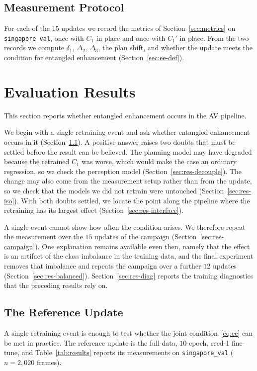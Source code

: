 \documentclass[conference]{IEEEtran}
\begin{document}
\subsection{Measurement Protocol}
For each of the $15$ updates we record the metrics of Section~\ref{sec:metrics} on
\texttt{singapore\_val}, once with $C_1$ in place and once with $C_1'$ in place.
From the two records we compute $\delta_1$, $\Delta_2$, $\Delta_3$, the plan shift,
and whether the update meets the condition for entangled enhancement
(Section~\ref{sec:ee-def}).

\section{Evaluation Results}
\label{sec:results}
This section reports whether entangled enhancement occurs in the AV pipeline.

We begin with a single retraining event and ask whether entangled enhancement
occurs in it (Section~\ref{sec:res-ref}). A positive answer raises two doubts
that must be settled before the result can be believed. The planning model may have
degraded because the retrained $C_1$ was worse, which would make the case an
ordinary regression, so we check the perception model
(Section~\ref{sec:res-decouple}). The change may also come from the measurement
setup rather than from the update, so we check that the models we did not retrain
were untouched (Section~\ref{sec:res-iso}). With both doubts settled, we locate
the point along the pipeline where the retraining has its largest effect
(Section~\ref{sec:res-interface}).

A single event cannot show how often the condition arises. We therefore repeat
the measurement over the $15$ updates of the campaign
(Section~\ref{sec:res-campaign}). One explanation remains available even then,
namely that the effect is an artifact of the class imbalance in the training
data, and the final experiment removes that imbalance and repeats the campaign
over a further $12$ updates (Section~\ref{sec:res-balanced}).
Section~\ref{sec:res-diag} reports the training diagnostics that the preceding
results rely on.

\subsection{The Reference Update}
\label{sec:res-ref}
A single retraining event is enough to test whether the joint
condition~\eqref{eq:ee} can be met in practice. The reference update is the
full-data, $10$-epoch, seed-1 fine-tune, and Table~\ref{tab:results} reports its
measurements on \texttt{singapore\_val} ($n=2{,}020$ frames).
\end{document}
